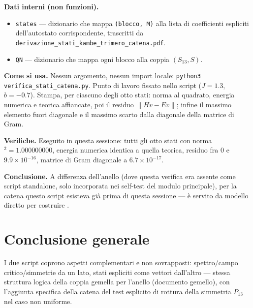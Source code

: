 \documentclass[11pt,a4paper]{article}
\begin{document}
\textbf{Dati interni (non funzioni).}
\begin{itemize}
\item \texttt{states} — dizionario che mappa \texttt{(blocco, M)} alla lista di
coefficienti espliciti dell'autostato corrispondente, trascritti da
\texttt{derivazione\_stati\_kambe\_trimero\_catena.pdf}.
\item \texttt{QN} — dizionario che mappa ogni blocco alla coppia $(S_{13},S)$.
\end{itemize}

\textbf{Come si usa.} Nessun argomento, nessun import locale: \texttt{python3
verifica\_stati\_catena.py}. Punto di lavoro fissato nello script ($J=1.3$,
$b=-0.7$). Stampa, per ciascuno degli otto stati: norma al quadrato, energia numerica
e teorica affiancate, poi il residuo $\|Hv-Ev\|$; infine il massimo elemento fuori
diagonale e il massimo scarto dalla diagonale della matrice di Gram.

\textbf{Verifiche.} Eseguito in questa sessione: tutti gli otto stati con norma
$^2=1.000000000$, energia numerica identica a quella teorica, residuo fra $0$ e
$9.9\times10^{-16}$, matrice di Gram diagonale a $6.7\times10^{-17}$.

\textbf{Conclusione.} A differenza dell'anello (dove questa verifica era assente
come script standalone, solo incorporata nei self-test del modulo principale), per la
catena questo script esisteva già prima di questa sessione — è servito da modello
diretto per costruire \texttt{}.

\section*{Conclusione generale}

I due script coprono aspetti complementari e non sovrapposti: spettro/campo
critico/simmetrie da un lato, stati espliciti come vettori dall'altro — stessa
struttura logica della coppia gemella per l'anello (documento gemello), con
l'aggiunta specifica della catena del test esplicito di rottura della simmetria
$P_{13}$ nel caso non uniforme.
\end{document}
